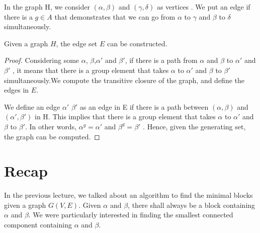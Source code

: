 In the graph H, we consider $(\alpha , \beta)$ and $(\gamma , \delta)$ as vertices . We put an edge if there is a $g \in A$ that demonstrates that we can go from $\alpha$ to $\gamma$ and $\beta$ to $\delta$ simultaneously.

\begin{claim} Given a graph $H$, the edge set $E$ can be constructed.
\begin{proof} Considering some $\alpha$, $\beta$,$\alpha'$ and $\beta'$, if there is a path from $\alpha$ and $\beta$ to $\alpha'$ and $\beta'$ , it means that there is a group element that takes $\alpha$ to $\alpha'$ and $\beta$ to $\beta'$ simultaneously.We compute the transitive closure of the graph, and define the edges in $E$.


We define an edge $\alpha'$ $\beta'$ as an edge in E if there is a path between $(\alpha,\beta)$ and $(\alpha',\beta')$ in H. This implies that there is a group element that takes $\alpha$ to $\alpha'$ and $\beta$ to $\beta'$. 
In other words, $\alpha^g = \alpha'$ and $\beta^g = \beta'$ .
Hence, given the generating set, the graph can be computed.
\end{proof}
\end{claim}



\section{Recap}
In the previous lecture, we talked about an algorithm to find the minimal blocks given a graph $G(V,E)$. Given $\alpha$ and $\beta$, there shall always be a block containing $\alpha$ and $\beta$. We were particularly interested in finding the smallest connected component containing $\alpha$ and $\beta$.

